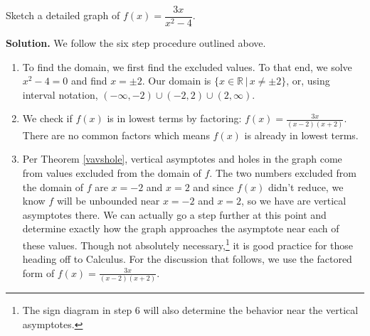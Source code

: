 \documentclass{ximera}
\begin{document}
\begin{ex}  Sketch a detailed graph of $f(x) = \dfrac{3x}{x^2-4}$.

\smallskip

{\bf Solution.}  We follow the six step procedure outlined above.

\begin{enumerate}

\item  To find the domain, we first find the excluded values.  To that end, we solve  $x^2 - 4 = 0$ and find $x = \pm 2$. Our domain is $\{ x \in \mathbb{R} \, | \,  x \neq \pm 2\}$, or, using interval notation,  $(-\infty, -2) \cup (-2,2) \cup (2,\infty)$.

\item  We check if  $f(x)$ is in lowest terms by factoring: $f(x) = \frac{3x}{(x-2)(x+2)}$.  There are no common factors which means $f(x)$ is already in lowest terms.

\item  Per Theorem \ref{vavshole}, vertical asymptotes and holes in the graph come from values excluded from the domain of $f$.  The two numbers excluded from the domain of $f$ are $x = -2$ and $x=2$ and since  $f(x)$ didn't reduce,  we know $f$ will be unbounded near  $x=-2$ and $x=2$, so we have are vertical asymptotes there.  We can actually go a step further at this point and determine exactly how the graph approaches the asymptote near each of these values. Though not absolutely necessary,\footnote{The sign diagram in step 6 will also determine the behavior near the vertical asymptotes.} it is good practice for those heading off to Calculus.  For the discussion that follows,  we use the factored form of $f(x) = \frac{3x}{(x-2)(x+2)}$.

\begin{itemize}


\end{itemize}
\end{enumerate}
\end{ex}
\end{document}
